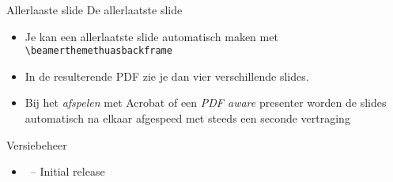 \documentclass[fleqn,aspectratio=169,dutch,10pt]{beamer}
\begin{document}
\begin{frame}[fragile]{Allerlaaste slide}
De allerlaatste slide
\begin{itemize}
\item Je kan een allerlaatste slide automatisch maken met \lstinline|\beamerthemethuasbackframe|
\item In de resulterende PDF zie je dan vier verschillende slides.
\item Bij het \textsl{afspelen} met Acrobat of een \textsl{PDF aware} presenter worden de slides automatisch na elkaar afgespeed met steeds een seconde vertraging
\end{itemize}

\end{frame}

\beamerthemethuasbackframe

\begin{frame}{Versiebeheer}
\begin{itemize}
\item \beamerthemethuasversion\ -- Initial release
\end{itemize}
\end{frame}

%
%
%
%
\end{document}
